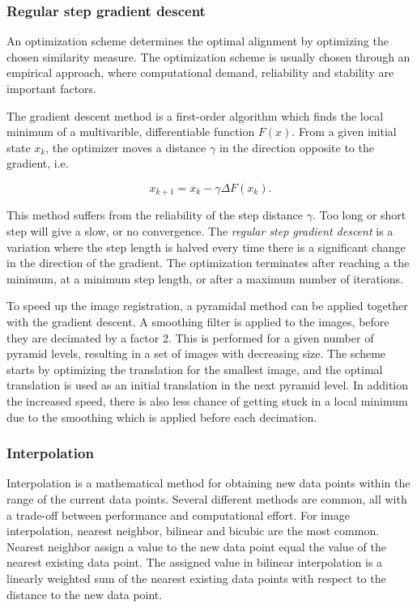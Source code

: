 \subsubsection{Regular step gradient descent}
An optimization scheme determines the optimal alignment by optimizing the chosen similarity measure. The optimization scheme is usually chosen through an empirical approach, where computational demand, reliability and stability are important factors. 

The gradient descent method is a first-order algorithm which finds the local minimum of a multivarible, differentiable function $F(x)$. From a given initial state $x_k$, the optimizer moves a distance $\gamma$ in the direction opposite to the gradient, i.e.

\begin{equation}
\label{gradient descent}
x_{k+1} = x_k - \gamma \Delta F(x_k).
\end{equation}

This method suffers from the reliability of the step distance $\gamma$. Too long or short step will give a slow, or no convergence. The \textit{regular step gradient descent} is a variation where the step length is halved every time there is a significant change in the direction of the gradient. The optimization terminates after reaching a the minimum, at a minimum step length, or after a maximum number of iterations.

To speed up the image registration, a pyramidal method can be applied together with the gradient descent. A smoothing filter is applied to the images, before they are decimated by a factor 2. This is performed for a given number of pyramid levels, resulting in a set of images with decreasing size. The scheme starts by optimizing the translation for the smallest image, and the optimal translation is used as an initial translation in the next pyramid level. In addition the increased speed, there is also less chance of getting stuck in a local minimum due to the smoothing which is applied before each decimation.
 
\subsubsection{Interpolation}
Interpolation is a mathematical method for obtaining new data points within the range of the current data points. Several different methods are common, all with a trade-off between performance and computational effort. For image interpolation, nearest neighbor, bilinear and bicubic are the most common. Nearest neighbor assign a value to the new data point equal the value of the nearest existing data point. The assigned value in bilinear interpolation is a linearly weighted sum of the nearest existing data points with respect to the distance to the new data point. 

